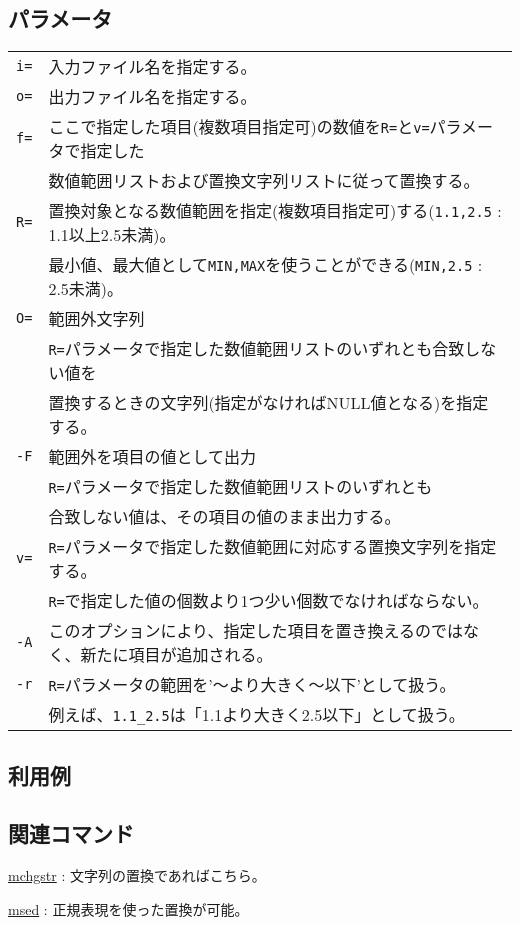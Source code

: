 \subsection*{パラメータ}
\begin{table}[htbp]
{\small
\begin{tabular}{ll}
\verb|i=|    & 入力ファイル名を指定する。\\
\verb|o=|    & 出力ファイル名を指定する。\\
\verb|f=|    & ここで指定した項目(複数項目指定可)の数値を\verb|R=|と\verb|v=|パラメータで指定した\\
             & 数値範囲リストおよび置換文字列リストに従って置換する。\\
\verb|R=|    & 置換対象となる数値範囲を指定(複数項目指定可)する(\verb|1.1,2.5| : 1.1以上2.5未満)。\\
             & 最小値、最大値として\verb|MIN,MAX|を使うことができる(\verb|MIN,2.5| : 2.5未満)。\\
\verb|O=|    & 範囲外文字列\\
             & \verb|R=|パラメータで指定した数値範囲リストのいずれとも合致しない値を\\
             & 置換するときの文字列(指定がなければNULL値となる)を指定する。\\
\verb|-F|    & 範囲外を項目の値として出力\\
             & \verb|R=|パラメータで指定した数値範囲リストのいずれとも\\
             & 合致しない値は、その項目の値のまま出力する。\\
\verb|v=|    & \verb|R=|パラメータで指定した数値範囲に対応する置換文字列を指定する。\\
             & \verb|R=|で指定した値の個数より1つ少い個数でなければならない。\\
\verb|-A|    & このオプションにより、指定した項目を置き換えるのではなく、新たに項目が追加される。\\
\verb|-r|    & \verb|R=|パラメータの範囲を'〜より大きく〜以下'として扱う。\\
             & 例えば、\verb|1.1_2.5|は「1.1より大きく2.5以下」として扱う。\\
\end{tabular} 
}
\end{table} 

\subsection*{利用例}

\subsection*{関連コマンド}

\hyperref[sect:mchgstr]{mchgstr} : 文字列の置換であればこちら。

\hyperref[sect:msed]{msed} : 正規表現を使った置換が可能。

%
